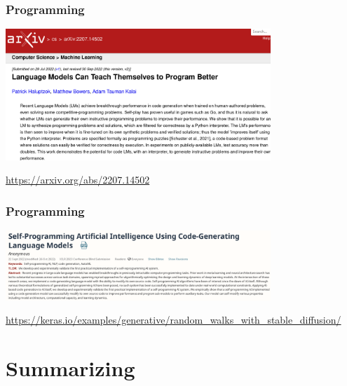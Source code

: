 \documentclass[17pt,aspectratio=169,hyperref={pdfusetitle,colorlinks,allcolors=olive}]{beamer}
\begin{document}
\begin{frame}[fragile]
  \frametitle{Programming}

  \begin{center}
    \includegraphics[width=10cm]{figs/llm-programming-better}
  \end{center}

  \begin{flushright}
    {\small
      \url{https://arxiv.org/abs/2207.14502}
    }
  \end{flushright}
  
\end{frame}

\begin{frame}[fragile]
  \frametitle{Programming}

  \begin{center}
    \includegraphics[width=10cm]{figs/self-programming}
  \end{center}

  \begin{flushright}
    {\scriptsize
      \url{https://keras.io/examples/generative/random_walks_with_stable_diffusion/}
    }
  \end{flushright}
  
\end{frame}




\section{Summarizing}
\end{document}
